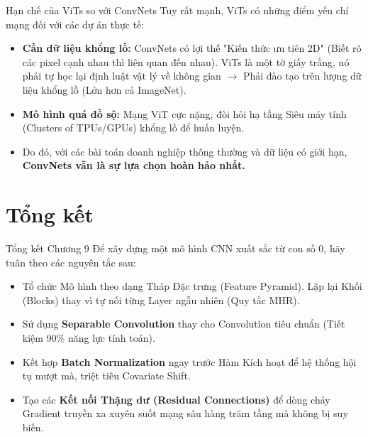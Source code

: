 \documentclass[aspectratio=169]{beamer}
\begin{document}
\begin{frame}{Hạn chế của ViTs so với ConvNets}
    Tuy rất mạnh, ViTs có những điểm yếu chí mạng đối với các dự án thực tế:
    \begin{itemize}
        \item \textbf{Cần dữ liệu khổng lồ:} ConvNets có lợi thế "Kiến thức ưu tiên 2D" (Biết rõ các pixel cạnh nhau thì liên quan đến nhau). ViTs là một tờ giấy trắng, nó phải tự học lại định luật vật lý về không gian $\rightarrow$ Phải đào tạo trên lượng dữ liệu khổng lồ (Lớn hơn cả ImageNet).
        \item \textbf{Mô hình quá đồ sộ:} Mạng ViT cực nặng, đòi hỏi hạ tầng Siêu máy tính (Clusters of TPUs/GPUs) khổng lồ để huấn luyện.
        \item Do đó, với các bài toán doanh nghiệp thông thường và dữ liệu có giới hạn, \textbf{ConvNets vẫn là sự lựa chọn hoàn hảo nhất.}
    \end{itemize}
\end{frame}

\section{Tổng kết}

\begin{frame}{Tổng kết Chương 9}
    Để xây dựng một mô hình CNN xuất sắc từ con số 0, hãy tuân theo các nguyên tắc sau:
    \begin{itemize}
        \item Tổ chức Mô hình theo dạng Tháp Đặc trưng (Feature Pyramid). Lặp lại Khối (Blocks) thay vì tự nối từng Layer ngẫu nhiên (Quy tắc MHR).
        \item Sử dụng \textbf{Separable Convolution} thay cho Convolution tiêu chuẩn (Tiết kiệm 90\% năng lực tính toán).
        \item Kết hợp \textbf{Batch Normalization} ngay trước Hàm Kích hoạt để hệ thống hội tụ mượt mà, triệt tiêu Covariate Shift.
        \item Tạo các \textbf{Kết nối Thặng dư (Residual Connections)} để dòng chảy Gradient truyền xa xuyên suốt mạng sâu hàng trăm tầng mà không bị suy biến.
    \end{itemize}
\end{frame}
\end{document}
